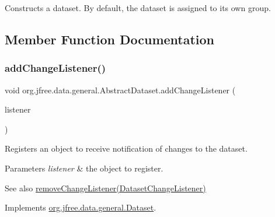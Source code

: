 Constructs a dataset. By default, the dataset is assigned to its own group. 

\subsection{Member Function Documentation}
\mbox{\label{classorg_1_1jfree_1_1data_1_1general_1_1_abstract_dataset_a98ccd0af41c59cd8fe50543376d0faf9}} 
\subsubsection{\texorpdfstring{add\+Change\+Listener()}{addChangeListener()}}
{\footnotesize\ttfamily void org.\+jfree.\+data.\+general.\+Abstract\+Dataset.\+add\+Change\+Listener (\begin{DoxyParamCaption}\item[{\mbox{\hyperlink{interfaceorg_1_1jfree_1_1data_1_1general_1_1_dataset_change_listener}{Dataset\+Change\+Listener}}}]{listener }\end{DoxyParamCaption})}

Registers an object to receive notification of changes to the dataset.


\begin{DoxyParams}{Parameters}
{\em listener} & the object to register.\\
\hline
\end{DoxyParams}
\begin{DoxySeeAlso}{See also}
\mbox{\hyperlink{classorg_1_1jfree_1_1data_1_1general_1_1_abstract_dataset_ab0a2ba36de45585c70212701459b5979}{remove\+Change\+Listener(\+Dataset\+Change\+Listener)}} 
\end{DoxySeeAlso}


Implements \mbox{\hyperlink{interfaceorg_1_1jfree_1_1data_1_1general_1_1_dataset_a34655e538642314586d5c92a4c055c4d}{org.\+jfree.\+data.\+general.\+Dataset}}.

\mbox{\label{classorg_1_1jfree_1_1data_1_1general_1_1_abstract_dataset_ac284644affaadfc85a8261665852e25b}} 
